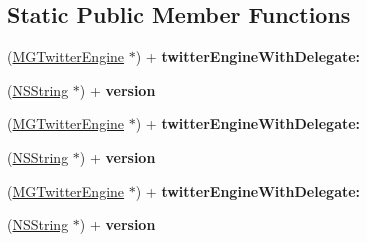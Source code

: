 \subsection*{\-Static \-Public \-Member \-Functions}
\begin{DoxyCompactItemize}
\item 
\hypertarget{interface_m_g_twitter_engine_af29a20402d05c1bcf4cedb62606f353e}{
(\hyperlink{interface_m_g_twitter_engine}{\-M\-G\-Twitter\-Engine} $\ast$) + {\bfseries twitter\-Engine\-With\-Delegate\-:}}
\label{interface_m_g_twitter_engine_af29a20402d05c1bcf4cedb62606f353e}

\item 
\hypertarget{interface_m_g_twitter_engine_a020cc19789c8d48031749376a23e4420}{
(\hyperlink{class_n_s_string}{\-N\-S\-String} $\ast$) + {\bfseries version}}
\label{interface_m_g_twitter_engine_a020cc19789c8d48031749376a23e4420}

\item 
\hypertarget{interface_m_g_twitter_engine_af29a20402d05c1bcf4cedb62606f353e}{
(\hyperlink{interface_m_g_twitter_engine}{\-M\-G\-Twitter\-Engine} $\ast$) + {\bfseries twitter\-Engine\-With\-Delegate\-:}}
\label{interface_m_g_twitter_engine_af29a20402d05c1bcf4cedb62606f353e}

\item 
\hypertarget{interface_m_g_twitter_engine_a020cc19789c8d48031749376a23e4420}{
(\hyperlink{class_n_s_string}{\-N\-S\-String} $\ast$) + {\bfseries version}}
\label{interface_m_g_twitter_engine_a020cc19789c8d48031749376a23e4420}

\item 
\hypertarget{interface_m_g_twitter_engine_af29a20402d05c1bcf4cedb62606f353e}{
(\hyperlink{interface_m_g_twitter_engine}{\-M\-G\-Twitter\-Engine} $\ast$) + {\bfseries twitter\-Engine\-With\-Delegate\-:}}
\label{interface_m_g_twitter_engine_af29a20402d05c1bcf4cedb62606f353e}

\item 
\hypertarget{interface_m_g_twitter_engine_a020cc19789c8d48031749376a23e4420}{
(\hyperlink{class_n_s_string}{\-N\-S\-String} $\ast$) + {\bfseries version}}
\label{interface_m_g_twitter_engine_a020cc19789c8d48031749376a23e4420}

\end{DoxyCompactItemize}
